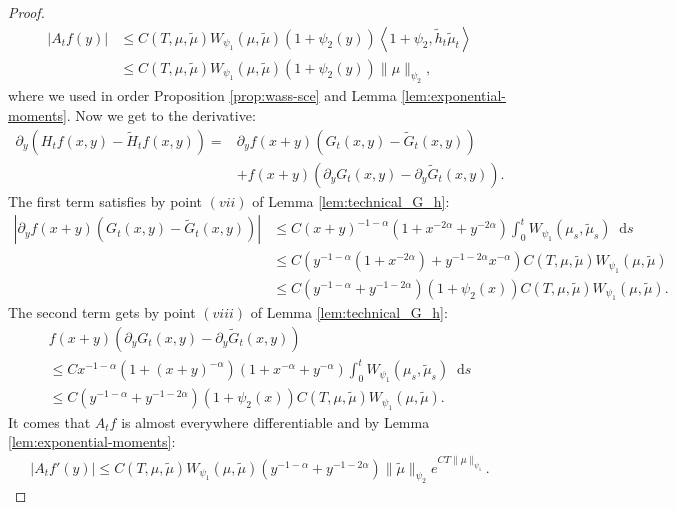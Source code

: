 \documentclass[11pt,a4paper]{article}
\newcommand{\brac}[1]{\left\langle#1\right\rangle}
\newcommand{\dd}{\mathop{}\!\mathrm{d}}
\begin{document}
\begin{proof}
\begin{align*}
        \left|A_tf(y)\right| 
        &\leq C(T,\mu,\tilde{\mu}) W_{\psi_1}\left(\mu,\tilde{\mu}\right)  \left(1 + \psi_2(y) \right) \brac{1+\psi_2,\tilde{h}_t\tilde{\mu}_t} \\
        &\leq C(T,\mu,\tilde{\mu}) W_{\psi_1}\left(\mu,\tilde{\mu}\right)  \left(1 + \psi_2(y) \right) \|\mu\|_{\psi_2},
    \end{align*}
    where we used in order Proposition \ref{prop:wass-sce} and Lemma \ref{lem:exponential-moments}. Now we get to the derivative:
    \begin{align*}
        \partial_y \left( H_tf(x,y)-\tilde{H}_tf(x,y)\right) =& \partial_y f(x+y) \left(G_t(x,y) - \tilde{G}_t(x,y) \right)\\
         &+ f(x+y)\left( \partial_y G_t(x,y) - \partial_y \tilde{G}_t(x,y) \right).
    \end{align*}
    The first term satisfies by point $(vii)$ of Lemma \ref{lem:technical_G_h}:
    \begin{align*}
        \left| \partial_y f(x+y) \left(G_t(x,y) - \tilde{G}_t(x,y) \right) \right| 
        &\leq C(x+y)^{-1-\alpha} (1 + x^{-2\alpha} + y^{-2\alpha}) \int_0^t W_{\psi_1}(\mu_s,\tilde{\mu}_s) \dd s \\
        &\leq C( y^{-1-\alpha}( 1 + x^{-2\alpha}) + y^{-1 - 2\alpha}x^{-\alpha} ) C(T,\mu,\tilde{\mu}) W_{\psi_1}(\mu,\tilde{\mu}) \\
        &\leq C(y^{-1-\alpha} + y^{-1 - 2\alpha})(1 + \psi_2(x)) C(T,\mu,\tilde{\mu}) W_{\psi_1}(\mu,\tilde{\mu}) .
    \end{align*}
    The second term gets by point $(viii)$ of Lemma \ref{lem:technical_G_h}:
    \begin{multline*}
        f(x+y)\left( \partial_y G_t(x,y) - \partial_y \tilde{G}_t(x,y) \right) \\
        \leq C x^{-1-\alpha} (1 + (x+y)^{-\alpha})(1 + x^{-\alpha} + y^{-\alpha}) \int_0^t W_{\psi_1}(\mu_s,\tilde{\mu}_s) \dd s \\
        \leq C(y^{-1-\alpha} + y^{-1 - 2\alpha})(1 + \psi_2(x)) C(T,\mu,\tilde{\mu}) W_{\psi_1}(\mu,\tilde{\mu}) .
    \end{multline*}
    It comes that $A_tf$ is almost everywhere differentiable and by Lemma \ref{lem:exponential-moments}:
    \begin{align*}
        \left| A_tf'(y) \right| \leq C(T,\mu,\tilde{\mu}) W_{\psi_1}(\mu,\tilde{\mu}) (y^{-1-\alpha} + y^{-1 - 2\alpha}) \|\tilde{\mu}\|_{\psi_2}e^{CT\|\mu\|_{\psi_1}}.
    \end{align*}

\end{proof}
\end{document}
